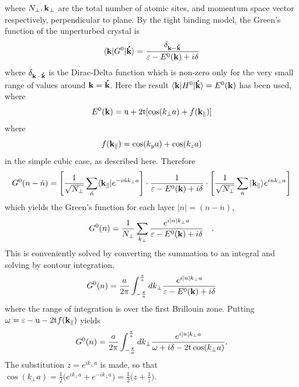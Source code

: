\documentclass[a4paper, 12pt]{article}
\begin{document}
where $N_\perp, {\bf k}_\perp$ are the total number of atomic sites, and momentum space vector respectively, perpendicular to plane.
By the tight binding model, the Green's function of the unperturbed crystal is
\begin{equation}
\langle {\bf k}|G^0|{\bf \acute{k}} \rangle = \frac{\delta_{\bf k-\acute{k}}}{\varepsilon-E^0 ({\bf k}) +i\delta}
\end{equation}
where $\delta_{\bf k-\acute{k}}$ is the Dirac-Delta function which is non-zero only for the very small range of values around $\bf k = \acute{k}$. Here the result $\langle {\bf k}|H^0|{\bf \acute{k}} \rangle = E^0 ({\bf k}) $ has been used, where
\begin{equation}
	E^0 ({\bf k})={\rm{u}}+2{\rm{t}}[\cos({{k}}_\perp a)+f({\bf k_\parallel})]
\end{equation}
where
\begin{equation}\label{disp}
	f({\bf k_\parallel}) = \cos({{k}}_y a)+\cos({{k}}_z a)
\end{equation}
in the simple cubic case, as described here. Therefore
\begin{equation}
	G^0(n - \acute{n}) = \left[ \frac{1}{\sqrt{N_\perp}}\sum_{\acute{n}} \langle{\bf k_\parallel}|e^{-i\acute{n}{{k}}_\perp a}\right]\cdot \frac{1}{\varepsilon-E^0 ({\bf k}) +i\delta} \cdot \left[ \frac{1}{\sqrt{N_\perp}}\sum_n |{\bf k_\parallel}\rangle e^{in{{k}}_\perp a}\right]
\end{equation}
which yields the Green's function for each layer $|n| = (n-\acute{n})$,
\begin{equation}
	G^0 (n) = \frac{1}{N_\perp}\sum_{{{k}}_\perp} \frac{e^{i|n|{{k}}_\perp a}}{\varepsilon-E^0 ({\bf k}) +i\delta} \quad .
\end{equation}
This is conveniently solved by converting the summation to an integral and solving by contour integration.
\begin{equation}
	G^0 (n) = \frac{a}{2\pi}\int_{-\frac{\pi}{a}}^{\frac{\pi}{a}} {d{{k}}_\perp} \frac{e^{i|n|{{k}}_\perp a}}{\varepsilon-E^0 ({\bf k}) +i\delta}
\end{equation}
where the range of integration is over the first Brillouin zone. Putting $\omega = \varepsilon -{\rm u} -2{\rm t}f({\bf k_\parallel})$ yields
\begin{equation}
	G^0 (n) = \frac{a}{2\pi}\int_{-\frac{\pi}{a}}^{\frac{\pi}{a}} {dk_\perp} \frac{e^{i|n|k_\perp a}}{\omega +i\delta - 2{\rm t}\cos(k_\perp a)} .
\end{equation}
The substitution $z=e^{ik_\perp a}$ is made, so that $\cos(k_\perp a) = \frac{1}{2}\big(e^{ik_\perp a}+e^{-ik_\perp a}\big)= \frac{1}{2}\big(z +\frac{1}{z}\big)$.
\end{document}

